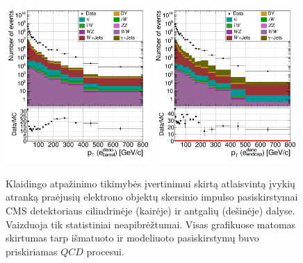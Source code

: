 \documentclass[a4paper, 12pt, oneside]{article}
\newcommand{\QCD}{QC\! D}
\begin{document}
\begin{figure}[t!]
	\includegraphics[width=0.49\textwidth]{Magistrinis/pT_e_barrel.png}
	\includegraphics[width=0.49\textwidth]{Magistrinis/pT_e_endcap.png}
	\vspace{-0.5cm}
	\caption{\label{fig:FRpT_e}
		Klaidingo atpažinimo tikimybės įvertinimui skirtą atlaisvintą įvykių atranką praėjusių elektrono objektų skersinio
		impulso pasiskirstymai CMS detektoriaus cilindrinėje (kairėje) ir antgalių (dešinėje) dalyse.
		Vaizduoja tik statistiniai neapibrėžtumai.
		Visas grafikuose matomas skirtumas tarp išmatuoto ir modeliuoto pasiskirstymų buvo priskiriamas $\QCD$ procesui.}
\end{figure}
\end{document}
